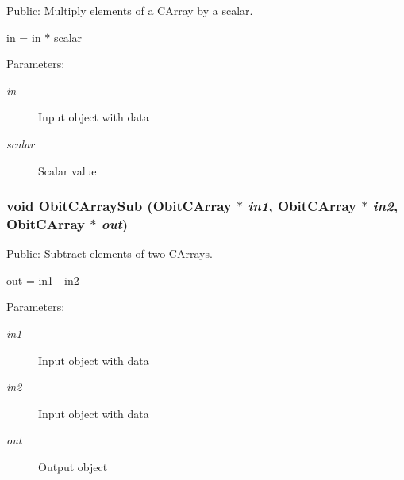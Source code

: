 Public: Multiply elements of a CArray by a scalar. 

in = in $\ast$ scalar \begin{Desc}
\item[Parameters:]
\begin{description}
\item[{\em in}]Input object with data \item[{\em scalar}]Scalar value \end{description}
\end{Desc}
\subsubsection{\setlength{\rightskip}{0pt plus 5cm}void Obit\-CArray\-Sub ({\bf Obit\-CArray} $\ast$ {\em in1}, {\bf Obit\-CArray} $\ast$ {\em in2}, {\bf Obit\-CArray} $\ast$ {\em out})}\label{ObitCArray_8h_a53}


Public: Subtract elements of two CArrays. 

out = in1 - in2 \begin{Desc}
\item[Parameters:]
\begin{description}
\item[{\em in1}]Input object with data \item[{\em in2}]Input object with data \item[{\em out}]Output object \end{description}
\end{Desc}
